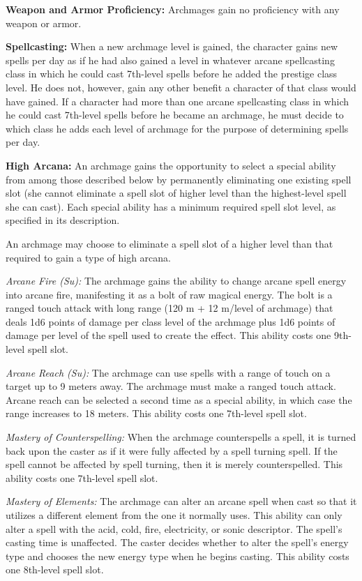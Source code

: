 {
\textbf{Weapon and Armor Proficiency:} Archmages gain no proficiency with any weapon or armor.

\textbf{Spellcasting:} When a new archmage level is gained, the character gains new spells per day as if he had also gained a level in whatever arcane spellcasting class in which he could cast 7th-level spells before he added the prestige class level. He does not, however, gain any other benefit a character of that class would have gained. If a character had more than one arcane spellcasting class in which he could cast 7th-level spells before he became an archmage, he must decide to which class he adds each level of archmage for the purpose of determining spells per day.

\textbf{High Arcana:} An archmage gains the opportunity to select a special ability from among those described below by permanently eliminating one existing spell slot (she cannot eliminate a spell slot of higher level than the highest-level spell she can cast). Each special ability has a minimum required spell slot level, as specified in its description.

An archmage may choose to eliminate a spell slot of a higher level than that required to gain a type of high arcana.

\textit{Arcane Fire (Su):} The archmage gains the ability to change arcane spell energy into arcane fire, manifesting it as a bolt of raw magical energy. The bolt is a ranged touch attack with long range (120 m + 12 m/level of archmage) that deals 1d6 points of damage per class level of the archmage plus 1d6 points of damage per level of the spell used to create the effect. This ability costs one 9th-level spell slot.

\textit{Arcane Reach (Su):} The archmage can use spells with a range of touch on a target up to 9 meters away. The archmage must make a ranged touch attack. Arcane reach can be selected a second time as a special ability, in which case the range increases to 18 meters. This ability costs one 7th-level spell slot.

\textit{Mastery of Counterspelling:} When the archmage counterspells a spell, it is turned back upon the caster as if it were fully affected by a spell turning spell. If the spell cannot be affected by spell turning, then it is merely counterspelled. This ability costs one 7th-level spell slot.

\textit{Mastery of Elements:} The archmage can alter an arcane spell when cast so that it utilizes a different element from the one it normally uses. This ability can only alter a spell with the acid, cold, fire, electricity, or sonic descriptor. The spell's casting time is unaffected. The caster decides whether to alter the spell's energy type and chooses the new energy type when he begins casting. This ability costs one 8th-level spell slot.

}
